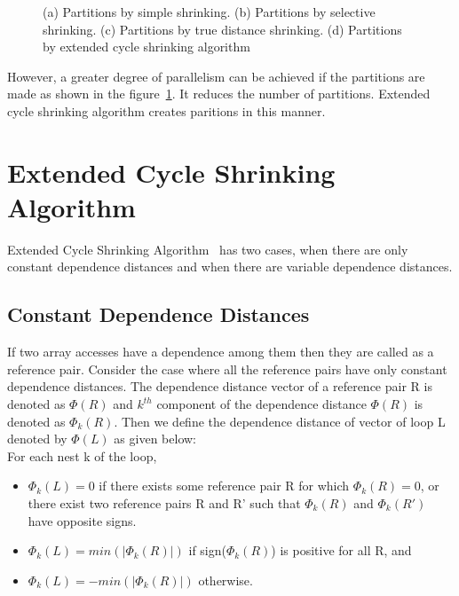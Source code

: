 \begin{figure}
\begin{subfigure}{0.45\textwidth}
  \caption{}
  \label{fig:extended}
\end{subfigure}
\caption{(a) Partitions by simple shrinking. (b) Partitions by selective shrinking. (c) Partitions by true distance shrinking. (d) Partitions by extended cycle shrinking algorithm}
\label{fig:cycle_shrinking_example}
\end{figure}

However, a greater degree of parallelism can be achieved if the partitions are made as shown in the figure~\ref{fig:extended}. It reduces the number of partitions.
Extended cycle shrinking algorithm creates paritions in this manner. \\


\section{Extended Cycle Shrinking Algorithm}

Extended Cycle Shrinking Algorithm~\cite{extended} has two cases, when there are only constant dependence distances and when there are variable dependence distances. \\

\subsection{Constant Dependence Distances}

If two array accesses have a dependence among them then they are called as a reference pair.
Consider the case where all the reference pairs have only constant dependence distances. The dependence distance vector of a reference pair R is denoted as $\Phi(R)$ and $k^{th}$ component of the dependence distance $\Phi(R)$ is denoted as $\Phi_{k}(R)$. Then we define the dependence distance of vector of loop L denoted by $\Phi(L)$ as given below: \\

For each nest k of the loop, 
\begin{itemize}
\item $\Phi_k(L) = 0$ if there exists some reference pair R for which $\Phi_k(R) = 0$, or there exist two reference pairs R and R' such that $\Phi_k(R)$ and $\Phi_k(R')$ have opposite signs. 
\item $\Phi_k(L) = min(|\Phi_k(R)|)$ if sign($\Phi_k(R)$) is positive for all R, and
\item $\Phi_k(L) = -min(|\Phi_k(R)|)$ otherwise.
\end{itemize}

